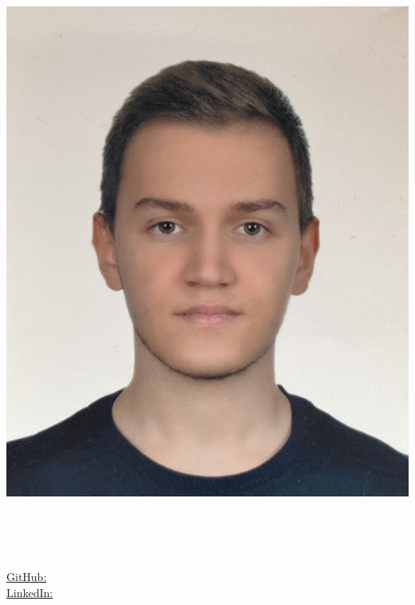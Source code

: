 \begin{center}
	\begin{minipage}[b]{.1\textwidth}
	\raggedright	
        \graphicspath{ {./images/} }
        \includegraphics[scale=0.06]{photo.jpeg} \\
	\end{minipage}%
	\begin{minipage}[b]{.7\textwidth}
	\makeatletter
    \hspace{6em}
	\centering {\Huge \@author} \\
	\makeatother
    \vspace{2em}
	\end{minipage}%
        \begin{minipage}[b]{.2\textwidth}
	\raggedleft
	{\large \phone} \\ %
	{\city} \\ %
	\href{mailto:\email}{\email} %
	\raggedleft
	\href{https://github.com/\github}{GitHub: \github} \\%
	\href{https://www.linkedin.com/in/\LinkedIn}{LinkedIn: \LinkedIn} \\%
	\end{minipage}

\end{center}